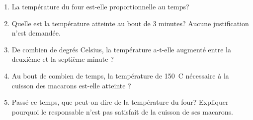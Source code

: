 \documentclass[10pt]{article}
\begin{document}
\begin{enumerate}
\item La température du four est-elle proportionnelle au temps?
\item Quelle est la température atteinte au bout de $3$ minutes? Aucune justification n'est demandée.
\item De combien de degrés Celsius, la température a-t-elle augmenté entre la deuxième et la septième
minute ?
\item Au bout de combien de temps, la température de 150~\degres C nécessaire à la cuisson des macarons
est-elle atteinte ?
\item Passé ce temps, que peut-on dire de la température du four? Expliquer pourquoi le responsable
n'est pas satisfait de la cuisson de ses macarons.
\end{enumerate}

\bigskip
\end{document}
